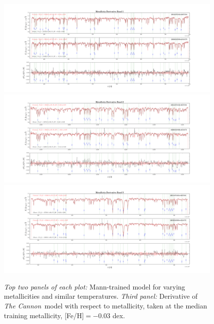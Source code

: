 \documentclass[modern]{aastex62}
\newcommand{\thecannon}{\textsl{The Cannon}}
\begin{document}
\begin{figure}[ht]
\begin{center}
\includegraphics[width=16cm]{figures/demo_derivatives_feh1.png}
\includegraphics[width=16cm]{figures/demo_derivatives_feh2.png}
\includegraphics[width=16cm]{figures/demo_derivatives_feh3.png}
\end{center}
\caption{\textit{Top two panels of each plot:} Mann-trained model for varying metallicities and similar temperatures. \textit{Third panel:} Derivative of \thecannon\ model with respect to metallicity, taken at the median training metallicity, [Fe/H]$=-0.03$ dex.} \label{fig:demo_feh}
\end{figure}
\end{document}
